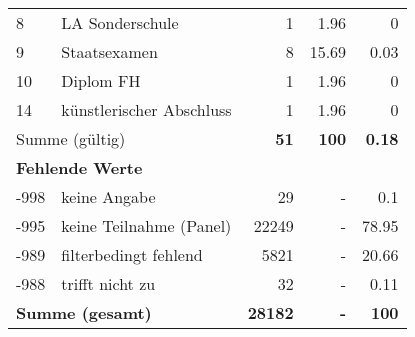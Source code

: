 \begin{longtable}{lXrrr}
     8 &
     \multicolumn{1}{X}{ LA Sonderschule   } &


       \num{1} &
       \num[round-mode=places,round-precision=2]{1,96} &
         \num[round-mode=places,round-precision=2]{0} \\

     9 &
     \multicolumn{1}{X}{ Staatsexamen   } &


       \num{8} &
       \num[round-mode=places,round-precision=2]{15,69} &
         \num[round-mode=places,round-precision=2]{0,03} \\

     10 &
     \multicolumn{1}{X}{ Diplom FH   } &


       \num{1} &
       \num[round-mode=places,round-precision=2]{1,96} &
         \num[round-mode=places,round-precision=2]{0} \\

     14 &
     \multicolumn{1}{X}{ künstlerischer Abschluss   } &


       \num{1} &
       \num[round-mode=places,round-precision=2]{1,96} &
         \num[round-mode=places,round-precision=2]{0} \\
     \midrule
     \multicolumn{2}{l}{Summe (gültig)} &
       \textbf{\num{51}} &
     \textbf{100} &
       \textbf{\num[round-mode=places,round-precision=2]{0,18}} \\
     \multicolumn{5}{l}{\textbf{Fehlende Werte}}\\
       -998 &
       keine Angabe &
         \num{29} &
        - &
         \num[round-mode=places,round-precision=2]{0,1} \\
       -995 &
       keine Teilnahme (Panel) &
         \num{22249} &
        - &
         \num[round-mode=places,round-precision=2]{78,95} \\
       -989 &
       filterbedingt fehlend &
         \num{5821} &
        - &
         \num[round-mode=places,round-precision=2]{20,66} \\
       -988 &
       trifft nicht zu &
         \num{32} &
        - &
         \num[round-mode=places,round-precision=2]{0,11} \\
     \midrule
     \multicolumn{2}{l}{\textbf{Summe (gesamt)}} &
          \textbf{\num{28182}} &
        \textbf{-} &
        \textbf{100} \\
     \bottomrule
     \end{longtable}
     
